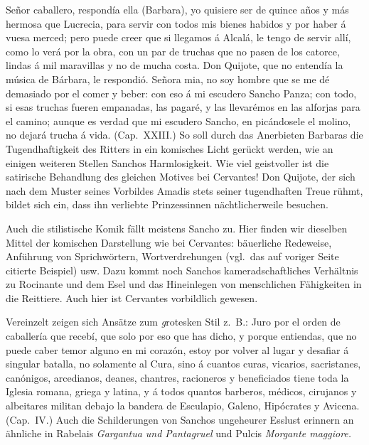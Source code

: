{\itquoted\spanish Señor caballero, respondía ella {\rm (Barbara),} yo quisiere ser de quince
años y más hermosa que Lucrecia, para servir con todos mis bienes
habidos y por haber á vuesa merced; pero puede creer que si llegamos
á Alcalá, le tengo de servir allí, como lo verá por la obra, con un par
de truchas que no pasen de los catorce, lindas á mil maravillas y no
de mucha costa. Don Quijote, que no entendía la música de Bárbara,
le respondió. Señora mia, no soy hombre que se me dé demasiado
por el comer y beber: con eso á mi escudero Sancho Panza; con todo,
si esas truchas fueren empanadas, las pagaré, y las llevarémos en las
alforjas para el camino; aunque es verdad que mi escudero Sancho,
en picándosele el molino, no dejará trucha á vida}. (Cap.~XXIII.) So soll
durch das Anerbieten Barbaras die Tugendhaftigkeit des Ritters in ein
komisches Licht gerückt werden, wie an einigen weiteren Stellen Sanchos
Harmlosigkeit. Wie viel geistvoller ist die satirische Behandlung des
gleichen Motives bei Cervantes! Don Quijote, der sich nach dem Muster
seines Vorbildes Amadis stets seiner tugendhaften Treue rühmt,
bildet sich ein, dass ihn verliebte Prinzessinnen nächtlicherweile besuchen.

Auch die stilistische Komik fällt meistens Sancho zu. Hier finden
wir dieselben Mittel der komischen Darstellung wie bei Cervantes:
bäuerliche Redeweise, Anführung von Sprichwörtern, Wortverdrehungen
(vgl.\ das auf voriger Seite citierte Beispiel) usw. Dazu kommt noch
Sanchos kameradschaftliches Verhältnis zu Rocinante und dem Esel und
das Hineinlegen von menschlichen Fähigkeiten in die Reittiere. Auch
hier ist Cervantes vorbildlich gewesen.

Vereinzelt zeigen sich Ansätze zum {\emph grotesken Stil} z.~B.:
{\itquoted\spanish Juro por el orden de caballería que recebí, que solo por eso que has
dicho, y porque entiendas, que no puede caber temor alguno en mi
corazón, estoy por volver al lugar y desafiar á singular batalla, no
solamente al Cura, sino á cuantos curas, vicarios, sacristanes, canónigos,
arcedianos, deanes, chantres, racioneros y beneficiados tiene toda la
Iglesia romana, griega y latina, y á todos quantos barberos, médicos,
cirujanos y albeitares militan debajo la bandera de Esculapio, Galeno,
Hipócrates y Avicena.} (Cap.~IV.) Auch die Schilderungen von Sanchos
ungeheurer Esslust erinnern an ähnliche in Rabelais {\it Gargantua und
Pantagruel\/} und Pulcis {\it Morgante maggiore.}

